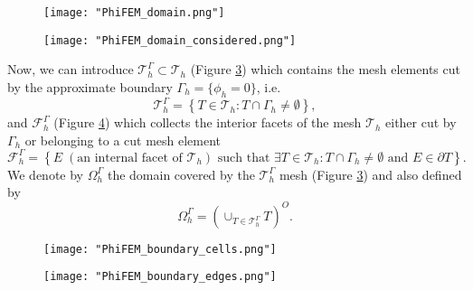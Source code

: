 \begin{minipage}{0.52\linewidth}
	\begin{figure}[H]
		\centering
		\texttt{[image: "PhiFEM\_domain.png"]}
		\label{space2}
	\end{figure}
\end{minipage} \;
\begin{minipage}{0.44\linewidth}
	\begin{figure}[H]
		\centering
		\texttt{[image: "PhiFEM\_domain\_considered.png"]}
		\label{space3}
	\end{figure}
\end{minipage}

Now, we can introduce $\mathcal{T}_h^\Gamma\subset \mathcal{T}_h$ (Figure \ref{space4}) which contains the mesh elements cut by the
approximate boundary $\Gamma_h = \{\phi_h=0\}$, i.e. 
\begin{equation*}
	\mathcal{T}_h^\Gamma=\left\{T\in \mathcal{T}_h:T\cap\Gamma_h\ne\emptyset\right\},
\end{equation*}
and $\mathcal{F}_h^\Gamma$ (Figure \ref{space5}) which collects the interior facets of the mesh $\mathcal{T}_h$ either cut by $\Gamma_h$ or belonging to a cut mesh element
\begin{equation*}
	\mathcal{F}_h^\Gamma=\left\{E\;(\text{an internal facet of } \mathcal{T}_h) \text{ such that } \exists T\in \mathcal{T}_h:T\cap\Gamma_h\ne\emptyset \text{ and } E\in\partial T\right\}.
\end{equation*}
We denote by $\Omega_h^\Gamma$ the domain covered by the $\mathcal{T}_h^\Gamma$ mesh (Figure \ref{space4}) and also defined by
\begin{equation*}
	\Omega_h^\Gamma=\left(\cup_{T\in\mathcal{T}_h^\Gamma}T\right)^O.
\end{equation*}

\begin{minipage}{0.48\linewidth}
	\begin{figure}[H]
		\centering
		\texttt{[image: "PhiFEM\_boundary\_cells.png"]}
		\label{space4}
	\end{figure}
\end{minipage} \;
\begin{minipage}{0.48\linewidth}
	\begin{figure}[H]
		\centering
		\texttt{[image: "PhiFEM\_boundary\_edges.png"]}
		\label{space5}
	\end{figure}
\end{minipage}

